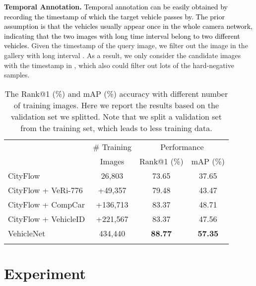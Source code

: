 \documentclass[journal]{IEEEtran}
\newcommand{\zznote}[1]{\textcolor{black}{#1}}
\begin{document}
\noindent \textbf{Temporal Annotation.} 
\zznote{Temporal annotation can be easily obtained by recording the timestamp of which the target vehicle passes by. The prior assumption is that the vehicles usually appear once in the whole camera network, indicating that the two images with long time interval belong to two different vehicles. }
Given the timestamp  of the query image, we filter out the image in the gallery with long interval . As a result, we only consider the candidate images with the timestamp in , which also could filter out lots of the hard-negative samples.  


\begin{table}
\caption{The Rank@1 (\%) and mAP (\%) accuracy with different number of training images. Here we report the results based on the validation set we splitted.  Note that we split a validation set from the training set, which leads to less training data. }
\vspace{-.2in}
\label{table:moredata}
\begin{center}
{
\setlength{\tabcolsep}{5pt}
\begin{tabular}{l|c|c c}
\shline
\multirow{2}{*}{Training Datasets} & \# Training & \multicolumn{2}{c}{Performance}\\
  & Images & Rank@1 (\%)& mAP (\%)\\
\hline
CityFlow \cite{tang@cityflow}  & 26,803 & 73.65 & 37.65 \\
CityFlow \cite{tang@cityflow}+ VeRi-776 \cite{liu2016deep} & +49,357 & 79.48 & 43.47\\
CityFlow \cite{tang@cityflow}+ CompCar \cite{yang2015large} & +136,713 & 83.37 & 48.71\\
CityFlow \cite{tang@cityflow}+ VehicleID \cite{liu2016pku} & +221,567 & 83.37 & 47.56\\
\shline
VehicleNet & 434,440 & \textbf{88.77} & \textbf{57.35} \\
\shline
\end{tabular}}
\end{center}
\vspace{-.1in}
\end{table}

\section{Experiment} \label{sec:experiment}
\end{document}
